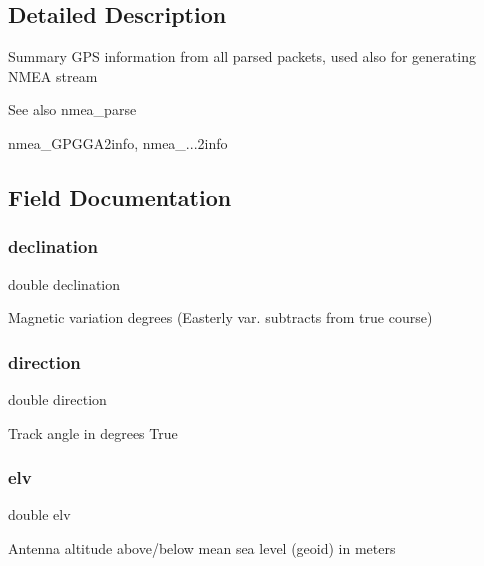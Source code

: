 \subsection{Detailed Description}
Summary G\+PS information from all parsed packets, used also for generating N\+M\+EA stream \begin{DoxySeeAlso}{See also}
nmea\+\_\+parse 

nmea\+\_\+\+G\+P\+G\+G\+A2info, nmea\+\_\+...2info 
\end{DoxySeeAlso}


\subsection{Field Documentation}
\mbox{\label{struct__nmea_i_n_f_o_a97780ae452ef3641542664e9f353a505}} 
\subsubsection{\texorpdfstring{declination}{declination}}
{\footnotesize\ttfamily double declination}

Magnetic variation degrees (Easterly var. subtracts from true course) \mbox{\label{struct__nmea_i_n_f_o_a8da9718bd3d0396135453cbb12751a5b}} 
\subsubsection{\texorpdfstring{direction}{direction}}
{\footnotesize\ttfamily double direction}

Track angle in degrees True \mbox{\label{struct__nmea_i_n_f_o_a0084f233551c00d3b369b7df69524e4f}} 
\subsubsection{\texorpdfstring{elv}{elv}}
{\footnotesize\ttfamily double elv}

Antenna altitude above/below mean sea level (geoid) in meters \mbox{\label{struct__nmea_i_n_f_o_a0e4ac2c68887146d35b9d396ec9e051c}} 
